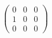 \documentclass{article}%
\begin{document}
%
\normalsize%
$\begin{pmatrix} 0 & 0 & 0 \\ 1 & 0 & 0 \\ 0 & 0 & 0 \end{pmatrix}$%
\end{document}
